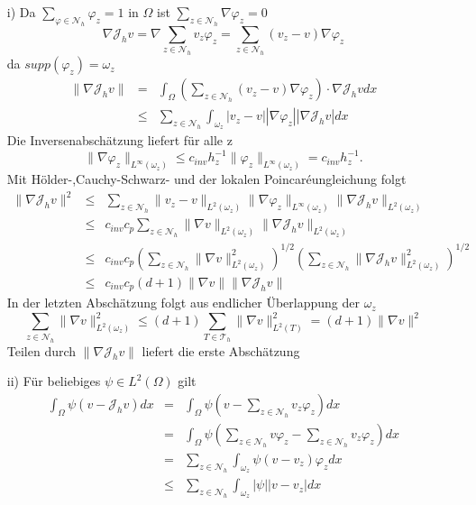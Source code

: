 \begin{itemize}
	\item[i)] Da $\sum_{\varphi\in\mathscr{N}_h}\varphi_z = 1$ in $\Omega$ ist $\sum_{z\in\mathscr{N}_h}\nabla \varphi_z=0$
	\[
	\nabla \mathscr{J}_hv = \nabla \sum_{z\in \mathscr{N}_h}v_z\varphi_z = \sum_{z\in \mathscr{N}_h}(v_z-v) \nabla\varphi_z
	\]
	da $supp(\varphi_z)=\omega_z$
	\begin{eqnarray*}
		\| \nabla \mathscr{J}_hv\| &=& \int_{\Omega}(\sum_{z\in \mathscr{N}_h}(v_z-v) \nabla\varphi_z)\cdot \nabla \mathscr{J}_hvdx\\
		&\leq& \sum_{z\in \mathscr{N}_h}\int_{\omega_z}|v_z-v| |\nabla\varphi_z||\nabla \mathscr{J}_hv|dx
	\end{eqnarray*}
Die Inversenabschätzung liefert für alle z
\[
\|\nabla\varphi_z\|_{L^\infty(\omega_z)}\leq c_{inv}h^{-1}_z\|\varphi_z\|_{L^\infty(\omega_z)} =c_{inv}h^{-1}_z.
\]
Mit Hölder-,Cauchy-Schwarz- und der lokalen Poincaréungleichung folgt
\begin{eqnarray*}
	\|\nabla\mathscr{J}_hv\|^2 &\leq&\sum_{z\in \mathscr{N}_h}\|v_z-v\|_{L^2(\omega_z)} \|\nabla\varphi_z\|_{L^\infty(\omega_z)}\|\nabla \mathscr{J}_hv\|_{L^2(\omega_z)}\\
	&\leq&c_{inv}c_p\sum_{z\in \mathscr{N}_h}\|\nabla v\|_{L^2(\omega_z)} \|\nabla \mathscr{J}_hv\|_{L^2(\omega_z)} \\
	&\leq&c_{inv}c_p(\sum_{z\in \mathscr{N}_h}\|\nabla v\|_{L^2(\omega_z)}^2)^{1/2} (\sum_{z\in \mathscr{N}_h} \|\nabla \mathscr{J}_hv\|_{L^2(\omega_z)}^2)^{1/2} \\
	&\leq&c_{inv}c_p(d+1)\|\nabla v\| \|\nabla \mathscr{J}_hv\|
\end{eqnarray*} 
In der letzten Abschätzung folgt aus endlicher Überlappung der $\omega_z$
\[
\sum_{z\in \mathscr{N}_h}\|\nabla v\|_{L^2(\omega_z)}^2 \leq (d+1)\sum_{T\in\mathscr{T}_h} \|\nabla v\|^2_{L^2(T)} = (d+1)\|\nabla v\|^2
\]
Teilen durch $\|\nabla\mathscr{J}_hv\|$ liefert die erste Abschätzung
\item[ii)] Für beliebiges $\psi \in L^2(\Omega)$ gilt
\begin{eqnarray*}
	\int_{\Omega}\psi(v-\mathscr{J}_hv)dx &=& \int_{\Omega}\psi(v-\sum_{z\in \mathscr{N}_h}v_z\varphi_z)dx \\
	 &=& \int_{\Omega}\psi(\sum_{z\in \mathscr{N}_h}v\varphi_z-\sum_{z\in \mathscr{N}_h}v_z\varphi_z)dx\\
	 &=&\sum_{z\in \mathscr{N}_h}\int_{\omega_z} \psi (v-v_z)\varphi_zdx \\
	 &\leq&\sum_{z\in \mathscr{N}_h}\int_{\omega_z} |\psi| |v-v_z|dx \\

\end{eqnarray*}
\end{itemize}
